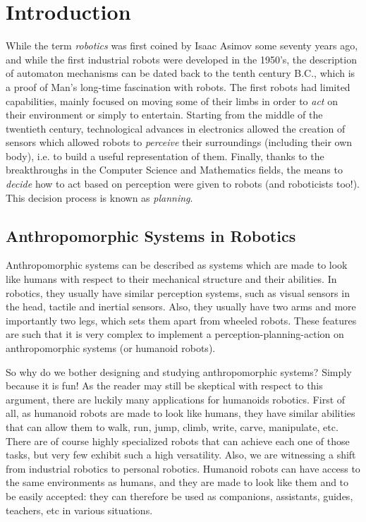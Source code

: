 \chapter{Introduction}
\label{chap:chap0}

While the term \emph{robotics} was first coined by Isaac Asimov some
seventy years ago, and while the first industrial robots were
developed in the 1950's, the description of automaton mechanisms can
be dated back to the tenth century B.C., which is a proof of Man's
long-time fascination with robots. The first robots had limited
capabilities, mainly focused on moving some of their limbs in order to
\emph{act} on their environment or simply to entertain. Starting from
the middle of the twentieth century, technological advances in
electronics allowed the creation of sensors which allowed robots to
\emph{perceive} their surroundings (including their own body), i.e. to
build a useful representation of them. Finally, thanks to the
breakthroughs in the Computer Science and Mathematics fields, the
means to \emph{decide} how to act based on perception were given to
robots (and roboticists too!). This decision process is known as
\emph{planning}.

\section{Anthropomorphic Systems in Robotics}

Anthropomorphic systems can be described as systems which are made to
look like humans with respect to their mechanical structure and their
abilities. In robotics, they usually have similar perception systems,
such as visual sensors in the head, tactile and inertial
sensors. Also, they usually have two arms and more importantly two
legs, which sets them apart from wheeled robots. These features are
such that it is very complex to implement a perception-planning-action
on anthropomorphic systems (or humanoid robots).

So why do we bother designing and studying anthropomorphic systems?
Simply because it is fun! As the reader may still be skeptical with
respect to this argument, there are luckily many applications for
humanoids robotics. First of all, as humanoid robots are made to look
like humans, they have similar abilities that can allow them to walk,
run, jump, climb, write, carve, manipulate, etc. There are of course
highly specialized robots that can achieve each one of those tasks,
but very few exhibit such a high versatility. Also, we are witnessing
a shift from industrial robotics to personal robotics. Humanoid robots
can have access to the same environments as humans, and they are made
to look like them and to be easily accepted: they can therefore be
used as companions, assistants, guides, teachers, etc in various
situations.


